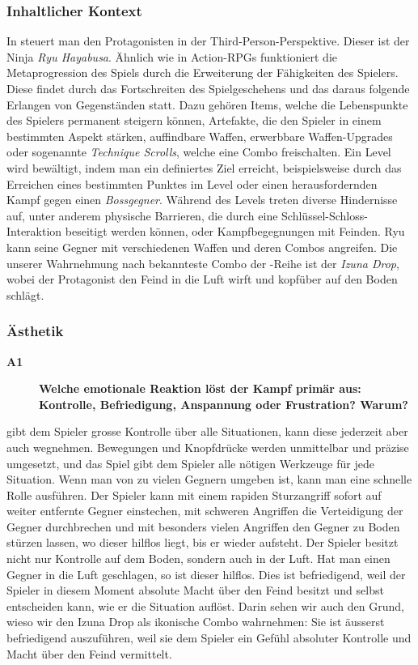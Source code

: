 \documentclass[../Main.tex]{subfiles}
\begin{document}
\subsubsection{Inhaltlicher Kontext}

In  steuert man den Protagonisten in der Third-Person-Perspektive. Dieser ist der Ninja \textit{Ryu Hayabusa}. Ähnlich wie in Action-RPGs funktioniert die Metaprogression des Spiels durch die Erweiterung der Fähigkeiten des Spielers. Diese findet durch das Fortschreiten des Spielgeschehens und das daraus folgende Erlangen von Gegenständen statt. Dazu gehören Items, welche die Lebenspunkte des Spielers permanent steigern können, Artefakte, die den Spieler in einem bestimmten Aspekt stärken, auffindbare Waffen, erwerbbare Waffen-Upgrades oder sogenannte \textit{Technique Scrolls}, welche eine Combo freischalten. Ein Level wird bewältigt, indem man ein definiertes Ziel erreicht, beispielsweise durch das Erreichen eines bestimmten Punktes im Level oder einen herausfordernden Kampf gegen einen \textit{Bossgegner}. Während des Levels treten diverse Hindernisse auf, unter anderem physische Barrieren, die durch eine Schlüssel-Schloss-Interaktion beseitigt werden können, oder Kampfbegegnungen mit Feinden. Ryu kann seine Gegner mit verschiedenen Waffen und deren Combos angreifen. Die unserer Wahrnehmung nach bekannteste Combo der -Reihe ist der \textit{Izuna Drop}, wobei der Protagonist den Feind in die Luft wirft und kopfüber auf den Boden schlägt.

\subsubsection{Ästhetik}

\begin{description}
    \item[\textbf{A1}] \textbf{Welche emotionale Reaktion löst der Kampf primär aus: Kontrolle, Befriedigung, Anspannung oder Frustration? Warum?}
\end{description}

 gibt dem Spieler grosse Kontrolle über alle Situationen, kann diese jederzeit aber auch wegnehmen. Bewegungen und Knopfdrücke werden unmittelbar und präzise umgesetzt, und das Spiel gibt dem Spieler alle nötigen Werkzeuge für jede Situation. Wenn man von zu vielen Gegnern umgeben ist, kann man eine schnelle Rolle ausführen. Der Spieler kann mit einem rapiden Sturzangriff sofort auf weiter entfernte Gegner einstechen, mit schweren Angriffen die Verteidigung der Gegner durchbrechen und mit besonders vielen Angriffen den Gegner zu Boden stürzen lassen, wo dieser hilflos liegt, bis er wieder aufsteht. Der Spieler besitzt nicht nur Kontrolle auf dem Boden, sondern auch in der Luft. Hat man einen Gegner in die Luft geschlagen, so ist dieser hilflos. Dies ist befriedigend, weil der Spieler in diesem Moment absolute Macht über den Feind besitzt und selbst entscheiden kann, wie er die Situation auflöst. Darin sehen wir auch den Grund, wieso wir den Izuna Drop als ikonische Combo wahrnehmen: Sie ist äusserst befriedigend auszuführen, weil sie dem Spieler ein Gefühl absoluter Kontrolle und Macht über den Feind vermittelt.
\end{document}
